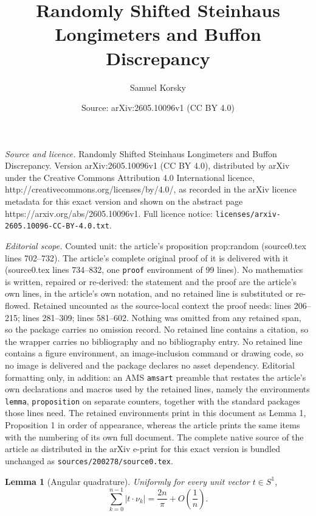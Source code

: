 \documentclass[10pt,a4paper]{amsart}
\title{Randomly Shifted Steinhaus Longimeters and Buffon Discrepancy}
\author{Samuel Korsky}
\date{Source: arXiv:2605.10096v1 (CC BY 4.0)}
\newtheorem{lemma}{Lemma}
\begin{document}
\maketitle

\noindent\emph{Source and licence.} Randomly Shifted Steinhaus Longimeters and Buffon Discrepancy. Version arXiv:2605.10096v1 (CC BY 4.0), distributed by arXiv under the Creative Commons Attribution 4.0 International licence, http://creativecommons.org/licenses/by/4.0/, as recorded in the arXiv licence metadata for this exact version and shown on the abstract page https://arxiv.org/abs/2605.10096v1. Full licence notice: \texttt{licenses/arxiv-2605.10096-CC-BY-4.0.txt}.\par\smallskip

\noindent\textit{Editorial scope.} Counted unit: the article's proposition prop:random (source0.tex lines 702--732). The article's complete original proof of it is delivered with it (source0.tex lines 734--832, one \texttt{proof} environment of 99 lines). No mathematics is written, repaired or re-derived: the statement and the proof are the article's own lines, in the article's own notation, and no retained line is substituted or re-flowed.  Retained uncounted as the source-local context the proof needs: lines 206--215; lines 281--309; lines 581--602.  Nothing was omitted from any retained span, so the package carries no omission record.  No retained line contains a citation, so the wrapper carries no bibliography and no bibliography entry.  No retained line contains a figure environment, an image-inclusion command or drawing code, so no image is delivered and the package declares no asset dependency.  Editorial formatting only, in addition: an AMS \texttt{amsart} preamble that restates the article's own declarations and macros used by the retained lines, namely the environments \texttt{lemma}, \texttt{proposition} on separate counters, together with the standard packages those lines need.  The retained environments print in this document as Lemma 1, Proposition 1 in order of appearance, whereas the article prints the same items with the numbering of its own full document.  The complete native source of the article as distributed in the arXiv e-print for this exact version is bundled unchanged as \texttt{sources/200278/source0.tex}.
\begin{lemma}[Angular quadrature]\label{lem:angular}
Uniformly for every unit vector $t\in S^1$,
\[
        \sum_{k=0}^{n-1}|t\cdot\nu_k|
        =
        \frac{2n}{\pi}
        +
        O\left(\frac1n\right).
\]
\end{lemma}
\end{document}
